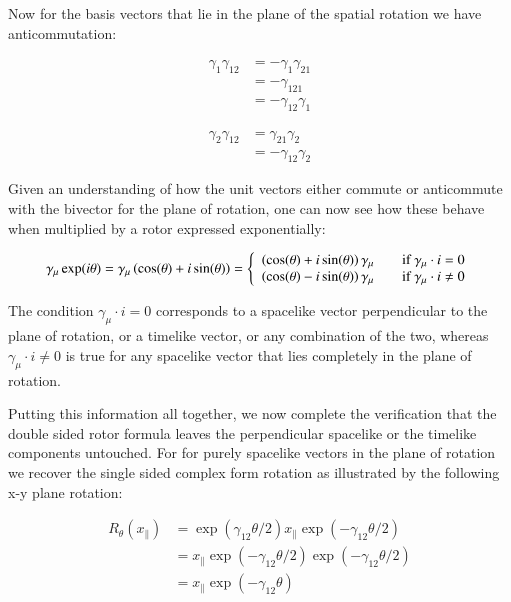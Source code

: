 \documentclass{article}      %
\begin{document}
Now for the basis vectors that lie in the plane of the spatial rotation we have anticommutation:

\begin{align*}
\gamma_{1} \gamma_{12} 
&= -\gamma_{1} \gamma_{21}  \\
&= -\gamma_{121} \\
&= -\gamma_{12} \gamma_{1}
\end{align*}

\begin{align*}
\gamma_{2} \gamma_{12} 
&= \gamma_{21}\gamma_{2} \\
&= -\gamma_{12}\gamma_{2}
\end{align*}

Given an understanding of how the unit vectors either commute or anticommute with the bivector for the plane of rotation, one can now see how these behave when multiplied by a rotor expressed exponentially:

\begin{equation}\label{eqn:spatialcommutationrule}
\gamma_{\mu}\exp(i\theta)
= \gamma_{\mu}\left( \cos(\theta) + i\sin(\theta) \right)
=
\left\{ 
\begin{array}{l l}
\left( \cos(\theta) + i\sin(\theta) \right) \gamma_{\mu} & \quad \mbox{if $\gamma_{\mu} \cdot i = 0$} \\
\left( \cos(\theta) - i\sin(\theta) \right) \gamma_{\mu} & \quad \mbox{if $\gamma_{\mu} \cdot i \ne 0$} \\
\end{array} \right.
\end{equation}

The condition $\gamma_{\mu} \cdot i = 0$ corresponds to a spacelike vector perpendicular to the plane of rotation, or a timelike vector, or any combination of the two, whereas
$\gamma_{\mu} \cdot i \ne 0$ is true for any spacelike vector that lies completely in the plane of rotation.

Putting this information all together, we now complete the verification that the double sided rotor formula leaves the perpendicular spacelike or the timelike components untouched.  For for purely spacelike vectors in the plane of rotation we recover the single sided complex form rotation as illustrated by the following x-y plane rotation:

\begin{align*}
R_{\theta}(x_{\parallel}) 
&= \exp( \gamma_{12}\theta/2) x_{\parallel} \exp( -\gamma_{12}\theta/2) \\
&= x_{\parallel} \exp( -\gamma_{12}\theta/2) \exp( -\gamma_{12}\theta/2) \\
&= x_{\parallel} \exp( -\gamma_{12}\theta) \\
\end{align*}
\end{document}
